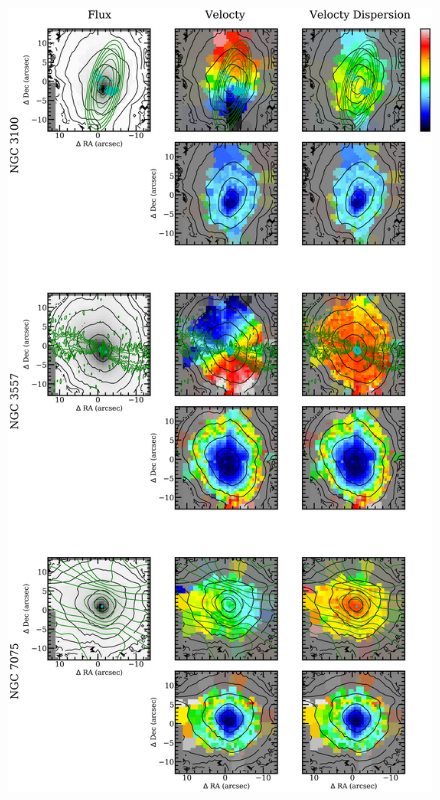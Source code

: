 		\begin{figure}
			\centering
			\includegraphics[height=0.94\textheight]{chapter4/vimos/kin3.png}
		\end{figure}
